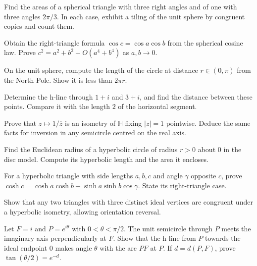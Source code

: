 \begin{exercise}[$\star$]\label{geometry:ex:lune}
Find the areas of a spherical triangle with three right angles and of one
with three angles $2\pi/3$. In each case, exhibit a tiling of the unit sphere
by congruent copies and count them.
\end{exercise}
\begin{exercise}[$\star$]\label{geometry:ex:sphpythag}
Obtain the right-triangle formula $\cos c=\cos a\cos b$ from the spherical
cosine law. Prove $c^2=a^2+b^2+O(a^4+b^4)$ as $a,b\to0$.
\end{exercise}
\begin{exercise}[$\star$]\label{geometry:ex:sphcircle}
On the unit sphere, compute the length of the circle at distance
$r\in(0,\pi)$ from the North Pole. Show it is less than $2\pi r$.
\end{exercise}
\begin{exercise}[$\star$]\label{geometry:ex:hpdist}
Determine the h-line through $1+i$ and $3+i$, and find the distance between
these points. Compare it with the length $2$ of the horizontal segment.
\end{exercise}
\begin{exercise}[$\star$]\label{geometry:ex:inversioniso}
Prove that $z\mapsto1/\overline z$ is an isometry of $\mathbb H$ fixing
$|z|=1$ pointwise. Deduce the same facts for inversion in any semicircle
centred on the real axis.
\end{exercise}
\begin{exercise}[$\star\star$]\label{geometry:ex:circles}
Find the Euclidean radius of a hyperbolic circle of radius $r>0$ about $0$
in the disc model. Compute its hyperbolic length and the area it encloses.
\end{exercise}
\begin{exercise}[$\star\star$]\label{geometry:ex:hypcos}
For a hyperbolic triangle with side lengths $a,b,c$ and angle $\gamma$
opposite $c$, prove
$\cosh c=\cosh a\cosh b-\sinh a\sinh b\cos\gamma$.
State its right-triangle case.
\end{exercise}
\begin{exercise}[$\star$]\label{geometry:ex:ideal}
Show that any two triangles with three distinct ideal vertices are
congruent under a hyperbolic isometry, allowing orientation reversal.
\end{exercise}
\begin{exercise}[$\star\star$]\label{geometry:ex:parallelangle}
Let $F=i$ and $P=e^{i\theta}$ with $0<\theta<\pi/2$.
The unit semicircle through $P$ meets the imaginary axis perpendicularly
at $F$. Show that the h-line from $P$ towards the ideal endpoint $0$
makes angle $\theta$ with the arc $PF$ at $P$.
If $d=d(P,F)$, prove $\tan(\theta/2)=e^{-d}$.
\end{exercise}
